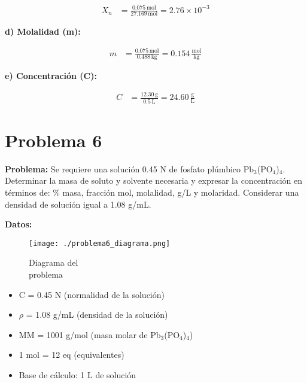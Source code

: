 \documentclass{article}
\begin{document}
\begin{align*}
    X_n &= \frac{0.075 \, \text{mol}}{27.169 \, \text{mol}} = 2.76 \times 10^{-3}
\end{align*}

\textbf{d) Molalidad (m):}

\begin{align*}
    m &= \frac{0.075 \, \text{mol}}{0.488 \, \text{kg}} = 0.154 \, \frac{\text{mol}}{\text{kg}}
\end{align*}

\textbf{e) Concentración (C):}

\begin{align*}
    C &= \frac{12.30 \, \text{g}}{0.5 \, \text{L}} = 24.60 \, \frac{\text{g}}{\text{L}}
\end{align*}










\newpage
\section*{Problema 6}
\textbf{Problema:}
Se requiere una solución 0.45 N de fosfato plúmbico Pb$_3$(PO$_4$)$_4$. Determinar la masa de soluto y solvente necesaria y expresar la concentración en términos de: \% masa, fracción mol, molalidad, g/L y molaridad. Considerar una densidad de solución igual a 1.08 g/mL.

\noindent\textbf{Datos:} %

\begin{figure}[H]
    \begin{minipage}[t]{0.3\textwidth} %
        \raggedright %
        \texttt{[image: ./problema6\_diagrama.png]} %
        \caption{Diagrama del \\ problema}
    \end{minipage}
\end{figure}

\textbf{} %
\begin{itemize}
\item C = 0.45 N (normalidad de la solución)
\item $\rho$ = 1.08 g/mL (densidad de la solución)
\item MM = 1001 g/mol (masa molar de Pb$_3$(PO$_4$)$_4$)
\item 1 mol = 12 eq (equivalentes)
\item Base de cálculo: 1 L de solución
\end{itemize}
\end{document}
